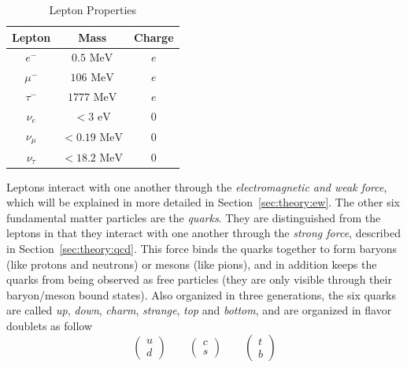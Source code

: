 \begin{table}[h!]
\begin{center}
\begin{tabular}{|c|c|c|}%
\hline
Lepton        & Mass           & Charge \\%
\hline
$e^{-}$      & $0.5 \mbox{ MeV}$      & $e$ \\%
$\mu^{-}$    & $106 \mbox{ MeV}$      & $e$ \\%
$\tau^{-}$   & $1777 \mbox{ MeV}$     & $e$ \\%
\hline                                      
$\nu_{e}$    & $< 3 \mbox{ eV}$       & $0$ \\%
$\nu_{\mu}$  & $< 0.19 \mbox{ MeV}$   & $0$ \\%
$\nu_{\tau}$ & $< 18.2 \mbox{ MeV}$   & $0$  \\%
\hline
\end{tabular}
\end{center}
\caption{Lepton Properties}
\label{table:theory:lepprop}
\end{table}
Leptons interact with one another through the \emph{electromagnetic and weak force}, which will be explained in more detailed in Section~\ref{sec:theory:ew}.\newline
The other six fundamental matter particles are the \emph{quarks}. They are distinguished from the leptons in that they interact with one another through the \emph{strong force}, described in Section~\ref{sec:theory:qcd}. This force binds the quarks together to form baryons (like protons and neutrons) or mesons (like pions), and in addition keeps the quarks from being observed as free particles (they are only visible through their baryon/meson bound states). Also organized in three generations, the six quarks are called \textit{up}, \textit{down}, \textit{charm}, \textit{strange}, \textit{top} and \textit{bottom}, and are organized in flavor doublets as follow
\begin{equation}
\label{eqn:quark_flavor_doublets}
\begin{pmatrix} u \\ d \end{pmatrix} \qquad
\begin{pmatrix} c \\ s \end{pmatrix} \qquad
\begin{pmatrix} t \\ b \end{pmatrix}
\end{equation}
